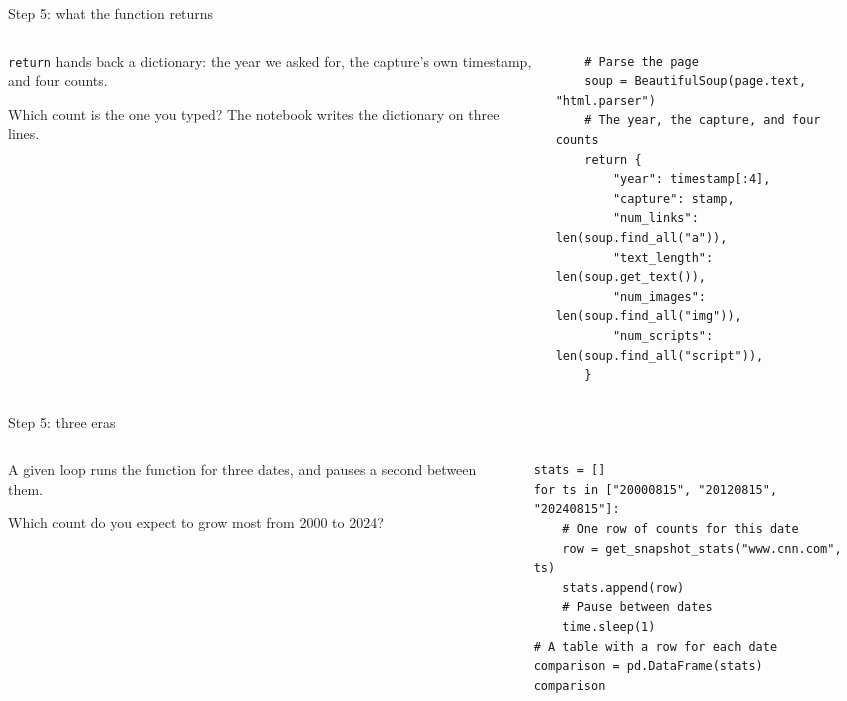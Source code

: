 \documentclass[9pt,aspectratio=169]{beamer}
\begin{document}
\begin{frame}[fragile]{Step 5: what the function returns}
    \begin{columns}[T]
        \begin{column}{0.37\textwidth}
            \texttt{return} hands back a dictionary: the year we asked for, the capture's own timestamp, and four counts.

            \medskip
            Which count is the one you typed? The notebook writes the dictionary on three lines.
        \end{column}
        \begin{column}{0.6\textwidth}
\begin{lstlisting}
    # Parse the page
    soup = BeautifulSoup(page.text, "html.parser")
    # The year, the capture, and four counts
    return {
        "year": timestamp[:4],
        "capture": stamp,
        "num_links": len(soup.find_all("a")),
        "text_length": len(soup.get_text()),
        "num_images": len(soup.find_all("img")),
        "num_scripts": len(soup.find_all("script")),
    }
\end{lstlisting}
        \end{column}
    \end{columns}
\end{frame}

\begin{frame}[fragile]{Step 5: three eras}
    \begin{columns}[T]
        \begin{column}{0.37\textwidth}
            A given loop runs the function for three dates, and pauses a second between them.

            \medskip
            Which count do you expect to grow most from 2000 to 2024?
        \end{column}
        \begin{column}{0.6\textwidth}
\begin{lstlisting}
stats = []
for ts in ["20000815", "20120815", "20240815"]:
    # One row of counts for this date
    row = get_snapshot_stats("www.cnn.com", ts)
    stats.append(row)
    # Pause between dates
    time.sleep(1)
# A table with a row for each date
comparison = pd.DataFrame(stats)
comparison
\end{lstlisting}
        \end{column}
    \end{columns}
\end{frame}
\end{document}
